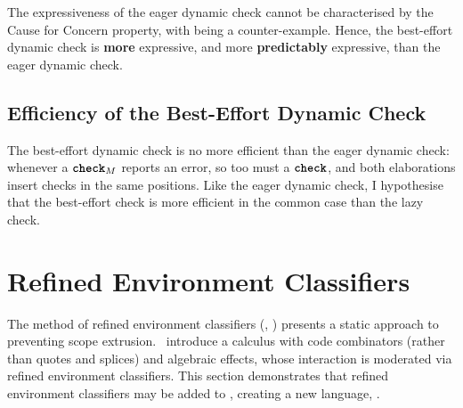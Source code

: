The expressiveness of the eager dynamic check cannot be characterised by the Cause for Concern property, with  being a counter-example. Hence, the best-effort dynamic check is \textbf{more} expressive, and more \textbf{predictably} expressive, than the eager dynamic check. 

\subsection{Efficiency of the Best-Effort Dynamic Check}\label{subsection:best-effort-efficient}
The best-effort dynamic check is no more efficient than the eager dynamic check: whenever a $\textbf{\texttt{check}}_M$ reports an error, so too must a $\textbf{\texttt{check}}$, and both elaborations insert checks in the same positions. Like the eager dynamic check, I hypothesise that the best-effort check is more efficient in the common case than the lazy check.


\section{Refined Environment Classifiers}\label{section:refined-environment-classifiers-formal}

The method of refined environment classifiers (, ) presents a static approach to preventing scope extrusion.\ \citet{isoda-24} introduce a calculus with code combinators (rather than quotes and splices) and algebraic effects, whose interaction is moderated via refined environment classifiers. This section demonstrates that refined environment classifiers may be added to \sourceLang{}, creating a new language, \recLang{}. 

